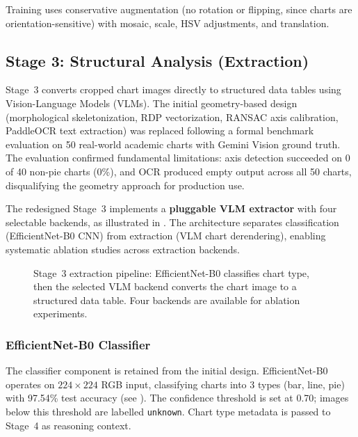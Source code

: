 Training uses conservative augmentation (no rotation or flipping, since charts are
orientation-sensitive) with mosaic, scale, HSV adjustments, and translation.

\subsection{Stage 3: Structural Analysis (Extraction)}
\label{sec:system_s3}

Stage~3 converts cropped chart images directly to structured data tables using
Vision-Language Models (VLMs). The initial geometry-based design (morphological
skeletonization, RDP vectorization, RANSAC axis calibration, PaddleOCR text extraction)
was replaced following a formal benchmark evaluation on 50 real-world academic charts
with Gemini Vision ground truth. The evaluation confirmed fundamental limitations:
axis detection succeeded on 0 of 40 non-pie charts (0\%), and OCR produced empty
output across all 50 charts, disqualifying the geometry approach for production use.

The redesigned Stage~3 implements a \textbf{pluggable VLM extractor} with four
selectable backends, as illustrated in . The architecture
separates classification (EfficientNet-B0 CNN) from extraction (VLM chart derendering),
enabling systematic ablation studies across extraction backends.

\begin{figure}[htbp]
\centering

\caption{Stage~3 extraction pipeline: EfficientNet-B0 classifies chart type, then the
    selected VLM backend converts the chart image to a structured data table.
    Four backends are available for ablation experiments.}
\label{fig:s3_submodules}
\end{figure}

\subsubsection{EfficientNet-B0 Classifier}

The classifier component is retained from the initial design.
EfficientNet-B0 \cite{tan2019efficientnet} operates on $224 \times 224$ RGB input,
classifying charts into 3 types (bar, line, pie) with 97.54\% test accuracy
(see ). The confidence threshold is set at 0.70; images
below this threshold are labelled \texttt{unknown}. Chart type metadata is passed
to Stage~4 as reasoning context.


